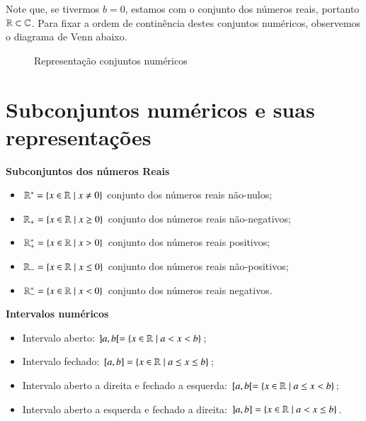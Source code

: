 Note que, se tivermos $b=0$, estamos com o conjunto dos números reais, portanto $\mathbb{R} \subset \mathbb{C}$. Para fixar a ordem de continência destes conjuntos numéricos, observemos o diagrama de Venn abaixo.

 \begin{figure}[H]
 \centering
    \caption{Representação conjuntos numéricos}
  \end{figure}

\section{Subconjuntos numéricos e suas representações}
\textbf{Subconjuntos dos números Reais}
\begin{itemize}
 \item $\mathbb{R}^{*}=\{x \in \mathbb{R} \mid x \neq 0\}$ conjunto dos números reais não-nulos;
 \item $\mathbb{R}_{+}=\{x \in \mathbb{R} \mid x \geq 0\}$ conjunto dos números reais não-negativos;
 \item $\mathbb{R}^{*}_{+}=\{x \in \mathbb{R} \mid x > 0\}$ conjunto dos números reais positivos;
 \item $\mathbb{R}_{-}=\{x \in \mathbb{R} \mid x \leq 0\}$ conjunto dos números reais não-positivos;
 \item $\mathbb{R}^{*}_{-}=\{x \in \mathbb{R} \mid x < 0\}$ conjunto dos números reais negativos.
\end{itemize}

\textbf{Intervalos numéricos}
\begin{itemize}
 \item Intervalo aberto: $]a, b[= \{x \in \mathbb{R} \mid a < x < b\}$;
 \item Intervalo fechado: $[a, b]= \{x \in \mathbb{R} \mid a \leq x \leq b\}$;
 \item Intervalo aberto a direita e fechado a esquerda: $[a, b[= \{x \in \mathbb{R} \mid a \leq x < b\}$;
 \item Intervalo aberto a esquerda e fechado a direita: $]a, b]= \{x \in \mathbb{R} \mid a < x \leq b\}$.
\end{itemize}


